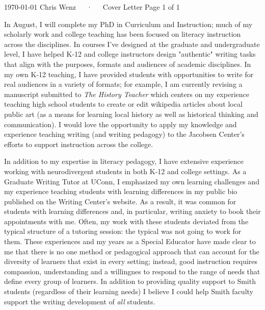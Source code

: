 \documentclass[11pt, a4paper]{awesome-cv}
\begin{document}
\makecvheader[C]

\makecvfooter
  {\today}
  {Chris Wenz~~~·~~~Cover Letter}
  {Page 1 of 1}

\makelettertitle

\begin{cvletter}

In August, I will complete my PhD in Curriculum and Instruction; much of my scholarly work and college teaching has been focused on literacy instruction across the disciplines. In courses I've designed at the graduate and undergraduate level, I have helped K-12 and college instructors design "authentic" writing tasks that align with the purposes, formats and audiences of academic disciplines. In my own K-12 teaching, I have provided  students with opportunities to write for real audiences in a variety of formats; for example, I am currently revising a manuscript submitted to \emph{The History Teacher} which centers on my experience teaching high school students to create or edit wikipedia articles about local public art (as a means for learning local history as well as historical thinking and communication). I would love the opportunity to apply my knowledge and experience teaching writing (and writing pedagogy) to the Jacobsen Center's efforts to support instruction across the college. 

In addition to my expertise in literacy pedagogy, I have extensive experience working with neurodivergent students in both K-12 and college settings. As a Graduate Writing Tutor at UConn, I emphasized my own learning challenges and my experience teaching students with learning differences in my public bio published on the Writing Center's website. As a result, it was common for students with learning differences and, in particular, writing anxiety to book their appointments with me. Often, my work with these students deviated from the typical structure of a tutoring session: the typical was not going to work for them. These experiences and my years as a Special Educator have made clear to me that there is no one method or pedagogical approach that can account for the diversity of learners that exist in every setting; instead, good instruction requires compassion, understanding and a willingnes to respond to the range of needs that define every group of learners. In addition to providing quality support to Smith students (regardless of their learning needs) I believe I could help Smith faculty support the writing development of \emph{all} students. 


\end{cvletter}
\end{document}
